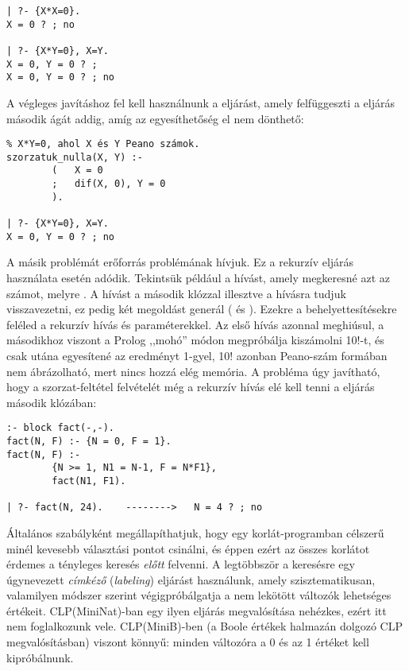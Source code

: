\begin{verbatim}
| ?- {X*X=0}.
X = 0 ? ; no

| ?- {X*Y=0}, X=Y.
X = 0, Y = 0 ? ;
X = 0, Y = 0 ? ; no
\end{verbatim}

A végleges javításhoz fel kell használnunk a  eljárást, amely
felfüggeszti a  eljárás második ágát addig, amíg
az egyesíthetőség el nem dönthető:

\begin{verbatim}
% X*Y=0, ahol X és Y Peano számok.
szorzatuk_nulla(X, Y) :-
        (   X = 0 
        ;   dif(X, 0), Y = 0
        ).

| ?- {X*Y=0}, X=Y.
X = 0, Y = 0 ? ; no
\end{verbatim}

A másik problémát erőforrás problémának hívjuk. Ez a rekurzív 
eljárás használata esetén adódik. Tekintsük például a  hívást,
amely megkeresné azt az  számot, melyre . A hívást a második
 klózzal illesztve a  hívásra tudjuk visszavezetni, ez
pedig két megoldást generál ( és ). Ezekre
a behelyettesítésekre feléled a rekurzív  hívás  és
 paraméterekkel. Az első hívás azonnal meghiúsul, a másodikhoz
viszont a Prolog ,,mohó'' módon megpróbálja kiszámolni 10!-t, és csak utána
egyesítené az eredményt 1-gyel, 10! azonban Peano-szám formában nem
ábrázolható, mert nincs hozzá elég memória. A probléma úgy javítható, hogy
a szorzat-feltétel felvételét még a rekurzív hívás elé kell tenni a 
eljárás második klózában:

\begin{verbatim}
:- block fact(-,-).
fact(N, F) :- {N = 0, F = 1}.
fact(N, F) :-
        {N >= 1, N1 = N-1, F = N*F1},
        fact(N1, F1).

| ?- fact(N, 24).    -------->   N = 4 ? ; no
\end{verbatim}

Általános szabályként megállapíthatjuk, hogy egy korlát-programban célszerű
minél kevesebb választási pontot csinálni, és éppen ezért az összes korlátot
érdemes a tényleges keresés \emph{előtt} felvenni. A legtöbbször a keresésre
egy úgynevezett \emph{címkéző} (\emph{labeling}) eljárást használunk, amely
szisztematikusan, valamilyen módszer szerint végigpróbálgatja a nem lekötött
változók lehetséges értékeit. CLP(MiniNat)-ban egy ilyen eljárás megvalósítása
nehézkes, ezért itt nem foglalkozunk vele. CLP(MiniB)-ben (a Boole értékek
halmazán dolgozó CLP megvalósításban) viszont könnyű: minden változóra a
0 és az 1 értéket kell kipróbálnunk.
